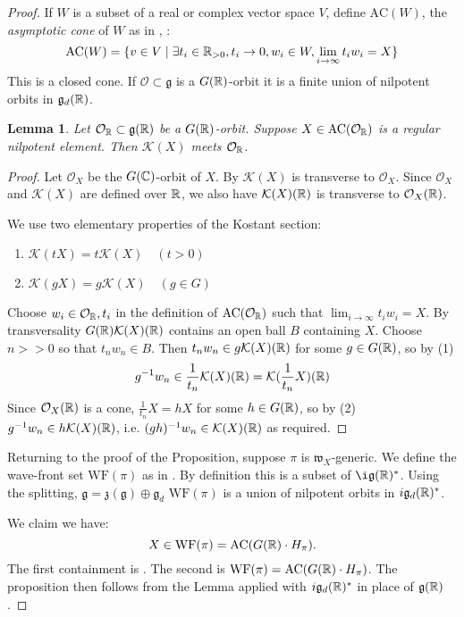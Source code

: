 \documentclass{article}
\newcommand{\inv}{^{-1}}
\newtheorem{lem}[thm]{Lemma}
\theoremstyle{definition}
\numberwithin{equation}{section}
\renewcommand{\-}{\hyp{}}
\newcommand{\g}{\mathfrak g}
\renewcommand{\O}{\mathcal O}
\newcommand{\K}{\mathcal K}
\newcommand{\w}{\mathfrak w}
\newcommand{\WF}{\mathrm{WF}}
\newcommand{\AC}{\mathrm{AC}}
\begin{document}
\begin{proof}
If $W$ is a subset of a real or complex vector space $V$, define  $\AC(W)$,  the  {\it asymptotic cone} of $W$ as in   \cite[Proposition 3.7]{bvlocal}, \cite[Definition 2.9]{avav}:
$$
\AC(W)=\{v\in V\mid \exists t_i\in \R_{>0},t_i\rightarrow 0,w_i\in W,\lim_{i\rightarrow\infty}t_i w_i=X\}
$$
This is a closed cone.
If $\O\subset \g$ is a $G(\mathbb{R})$-orbit it  is a finite union of nilpotent orbits in $\g_d(\R)$.

\begin{lem}
Let $\O_\R\subset \g(\R)$ be a $G(\mathbb{R})$-orbit. Suppose $X\in\AC(\O_\R)$ is a regular nilpotent element.
Then $\K(X)$ meets $\O_\R$.
\end{lem}

\begin{proof}
Let $\O_X$ be the $G(\mathbb{C})$-orbit of $X$.
By \cite{Kos63} $\K(X)$ is transverse to $\O_X$. 
Since $\O_X$ and $\K(X)$ are defined over $\mathbb{R}$, we also have
$\K(X)(\R)$ is transverse to $\O_X(\R)$.

We use two elementary properties of the Kostant section:
\begin{enumerate}
\item $\K(tX)=t\K(X)\quad (t>0)$
\item $\K(g X)=g\K(X)\quad (g\in G)$
\end{enumerate}

Choose $w_i\in\O_\R, t_i$ in the definition of $\AC(\O_\R)$ such that $\lim_{i\rightarrow\infty}t_i w_i=X$.
By transversality $G(\R)\K(X)(\R)$ contains an open ball $B$ containing $X$. 
Choose $n>>0$ so that $t_nw_n\in B$. Then $t_nw_n\in g\K(X)(\R)$ for some $g\in G(\mathbb{R})$, so by (1)
$$
g\inv w_n \in \frac 1{t_n}\K(X)(\R)=\K(\frac 1{t_n} X)(\R)
$$
Since $\O_X(\R)$ is a cone, $\frac 1{t_n}X=hX$ for some $h\in G(\mathbb{R})$, so by (2) $g\inv w_n \in h\K(X)(\R)$, i.e.
$(gh)\inv w_n\in \K(X)(\R)$ as required.
\end{proof}






Returning to the proof of the Proposition, suppose $\pi$ is $\w_X$-generic.
We define the wave-front set $\WF(\pi)$ as in \cite[Section 3]{matumoto}.
By definition this is a subset of $\i\g(\R)^*$.
Using the splitting, $\g=\mathfrak z(\g)\oplus\g_d$ 
$\WF(\pi)$ is a union of nilpotent orbits in $i\g_d(\R)^*$.

We claim we have:
$$
X\in \WF(\pi)=\AC(G(\R)\cdot H_\pi).
$$
The first containment is  \cite[Theorem A]{matumoto}.
The second is
\cite[Theorem 1.2]{harris} $\WF(\pi)=\AC(G(\R)\cdot H_\pi)$.
The proposition then follows from the Lemma applied with $i\g_d(\R)^*$ in place of $\g(\R)$.
\end{proof}
\end{document}
